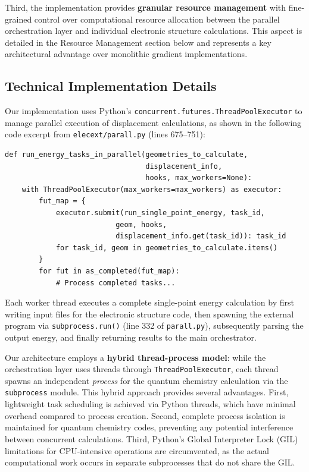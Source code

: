 \documentclass[11pt]{article}
\begin{document}
Third, the implementation provides \textbf{granular resource management} with fine-grained control over computational resource allocation between the parallel orchestration layer and individual electronic structure calculations. This aspect is detailed in the Resource Management section below and represents a key architectural advantage over monolithic gradient implementations.

\subsection{Technical Implementation Details}

Our implementation uses Python's \texttt{concurrent.futures.ThreadPoolExecutor} to manage parallel execution of displacement calculations, as shown in the following code excerpt from \texttt{elecext/parall.py} (lines 675--751):

\begin{lstlisting}
def run_energy_tasks_in_parallel(geometries_to_calculate,
                                 displacement_info,
                                 hooks, max_workers=None):
    with ThreadPoolExecutor(max_workers=max_workers) as executor:
        fut_map = {
            executor.submit(run_single_point_energy, task_id,
                          geom, hooks,
                          displacement_info.get(task_id)): task_id
            for task_id, geom in geometries_to_calculate.items()
        }
        for fut in as_completed(fut_map):
            # Process completed tasks...
\end{lstlisting}

Each worker thread executes a complete single-point energy calculation by first writing input files for the electronic structure code, then spawning the external program via \texttt{subprocess.run()} (line 332 of \texttt{parall.py}), subsequently parsing the output energy, and finally returning results to the main orchestrator.

Our architecture employs a \textbf{hybrid thread-process model}: while the orchestration layer uses threads through \texttt{ThreadPoolExecutor}, each thread spawns an independent \textit{process} for the quantum chemistry calculation via the \texttt{subprocess} module. This hybrid approach provides several advantages. First, lightweight task scheduling is achieved via Python threads, which have minimal overhead compared to process creation. Second, complete process isolation is maintained for quantum chemistry codes, preventing any potential interference between concurrent calculations. Third, Python's Global Interpreter Lock (GIL) limitations for CPU-intensive operations are circumvented, as the actual computational work occurs in separate subprocesses that do not share the GIL.
\end{document}
